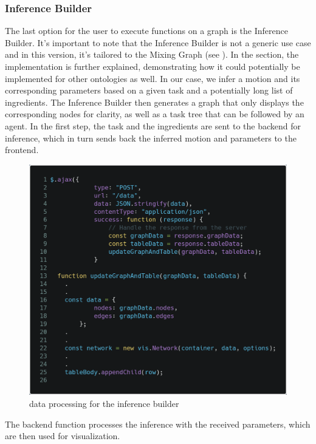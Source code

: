 \subsubsection{Inference Builder}
The last option for the user to execute functions on a graph is the Inference Builder. 
It's important to note that the Inference Builder is not a generic use case and in this version, it's tailored to the Mixing Graph (see ). 
In the  section, the implementation is further explained, demonstrating how it could potentially be implemented for other ontologies as well. 
In our case, we infer a motion and its corresponding parameters based on a given task and a potentially long list of ingredients. 
The Inference Builder then generates a graph that only displays the corresponding nodes for clarity, as well as a task tree that can be followed by an agent.
In the first step, the task and the ingredients are sent to the backend for inference, which in turn sends back the inferred motion and parameters to the frontend.

\begin{figure}[H]
    \includegraphics[scale=0.25]{Graphics/inference_builder_js.png}
    \caption{data processing for the inference builder}
\end{figure}

The backend function processes the inference with the received parameters, which are then used for visualization.

